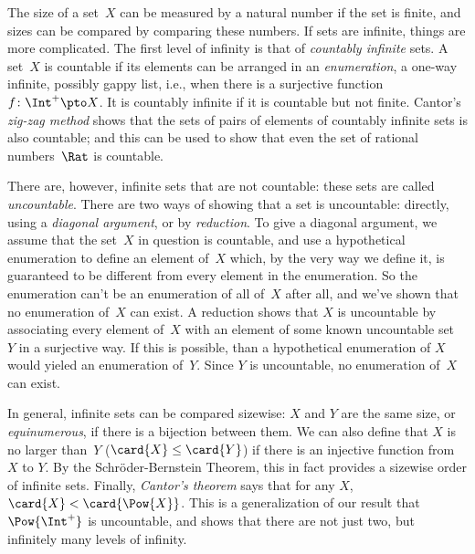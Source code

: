 The size of a set~$X$ can be measured by a natural number if the set
is finite, and sizes can be compared by comparing these numbers. If sets
are infinite, things are more complicated. The first level of
infinity is that of \emph{countably infinite} sets. A set~$X$ is
countable if its elements can be arranged in an \emph{enumeration}, a
one-way infinite, possibly gappy list, i.e., when there is a
surjective function~$f\colon \Int^+ \pto X$. It is countably infinite
if it is countable but not finite. Cantor's \emph{zig-zag method}
shows that the sets of pairs of elements of countably infinite sets is
also countable; and this can be used to show that even the set of
rational numbers~$\Rat$ is countable.

There are, however, infinite sets that are not countable: these sets
are called \emph{uncountable}. There are two ways of showing that a
set is uncountable: directly, using a \emph{diagonal argument}, or by
\emph{reduction}. To give a diagonal argument, we assume that the
set~$X$ in question is countable, and use a hypothetical enumeration
to define an element of~$X$ which, by the very way we define it, is
guaranteed to be different from every element in the enumeration. So
the enumeration can't be an enumeration of all of~$X$ after all, and
we've shown that no enumeration of~$X$ can exist. A reduction shows
that $X$ is uncountable by associating every element of~$X$ with an
element of some known uncountable set~$Y$ in a surjective way. If
this is possible, than a hypothetical enumeration of $X$ would yieled
an enumeration of~$Y$. Since $Y$ is uncountable, no enumeration of~$X$
can exist.

In general, infinite sets can be compared sizewise: $X$ and $Y$ are
the same size, or \emph{equinumerous}, if there is a bijection between
them. We can also define that $X$ is no larger than~$Y$ ($\card{X} \le
\card{Y}$) if there is an injective function from $X$ to
$Y$. By the Schr\"oder-Bernstein Theorem, this in fact provides a
sizewise order of infinite sets. Finally, \emph{Cantor's theorem}
says that for any $X$, $\card{X} < \card{\Pow{X}}$. This is a
generalization of our result that $\Pow{\Int^+}$ is uncountable, and
shows that there are not just two, but infinitely many levels of
infinity.
